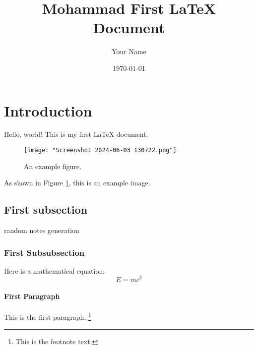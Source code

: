 \documentclass{article} %
\title{Mohammad First LaTeX Document}
\author{Your Name}
\date{\today}
\begin{document}
\maketitle %
\thispagestyle{empty} %
\newpage

\tableofcontents %
\newpage %
\listoftables    %
\newpage %
\listoffigures %
\newpage %

\section{Introduction}
Hello, world! This is my first LaTeX document.

\begin{figure}[h] %
  \centering
  \texttt{[image: "Screenshot 2024-06-03 130722.png"]} %
  \caption{An example figure.}
  \label{fig:test} %
\end{figure}
As shown in Figure \ref{fig:test}, this is an example image.

\subsection{First subsection}
random notes generation
\subsubsection{First Subsubsection}
Here is a mathematical equation:
\[
E = mc^2
\]
\paragraph{First Paragraph} 
\par %
This is the first paragraph.
\footnote{This is the footnote text.} %

\end{document}
